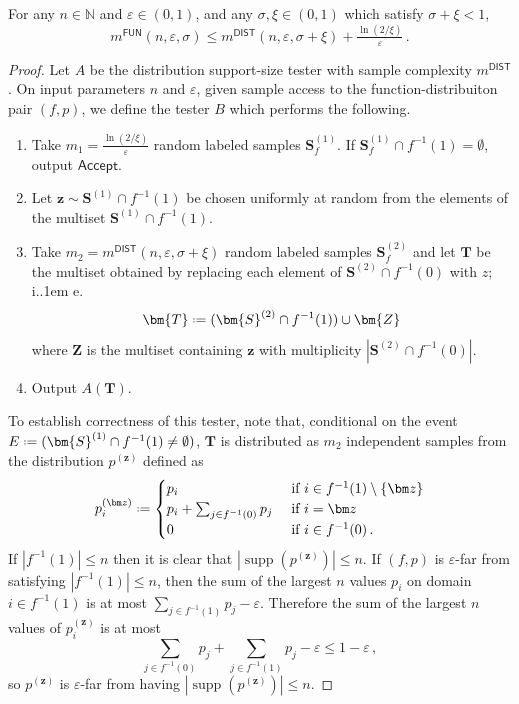 \documentclass{theoretics}
\newcommand*\ie{i.\kern.1em e.\ }
\DeclareMathOperator{\supp}{supp}   %
\newcommand*{\define}{\mathrel{\vcenter{\baselineskip0.5ex \lineskiplimit0pt
                      \hbox{\scriptsize.}\hbox{\scriptsize.}}}%
                      =}
\newcommand{\bN}{\ensuremath{\mathbb{N}}}
\newcommand{\ACCEPT}{\mathsf{Accept}}
\newcommand{\successprob}{\sigma}
\newcommand{\DIST}{\mathsf{DIST}}
\newcommand{\FUN}{\mathsf{FUN}}
\renewcommand{\epsilon}{\varepsilon}
\begin{document}
\begin{proposition}
\label{res:fun-to-dist}
For any $n \in \bN$ and $\epsilon \in (0,1)$, and any $\successprob, \xi \in (0,1)$ which satisfy
$\successprob + \xi < 1$,
\[
  m^\FUN(n,\epsilon, \successprob) \leq m^\DIST(n,\epsilon, \successprob + \xi) +
  \tfrac{\ln(2/\xi)}{\epsilon} \,.
\]
\end{proposition}
\begin{proof}
Let $A$ be the distribution support-size tester with sample complexity $m^\DIST$.
On input parameters $n$ and $\epsilon$, given sample access to the function-distribuiton pair
$(f,p)$, we define the tester $B$ which performs the following.
\begin{enumerate}
\item Take $m_1 = \tfrac{\ln(2/\xi)}{\epsilon}$ random labeled samples
$\bm{S}^{(1)}_f$. If $\bm{S}^{(1)}_f \cap f^{-1}(1) = \emptyset$, output $\ACCEPT$.
\item Let $\bm{z} \sim \bm{S}^{(1)} \cap f^{-1}(1)$ be chosen uniformly at random from the elements of the multiset
$\bm{S}^{(1)} \cap f^{-1}(1)$.
\item Take $m_2 = m^\DIST(n,\epsilon,\successprob + \xi)$ random labeled samples $\bm{S}^{(2)}_f$
and let $\bm{T}$ be the multiset obtained by replacing each element of $\bm{S}^{(2)} \cap f^{-1}(0)$
with $z$; \ie
\[
\bm{T} \define ( \bm{S}^{(2)} \cap f^{-1}(1) ) \cup \bm{Z}
\]
where  $\bm{Z}$ is the multiset containing $\bm{z}$ with multiplicity $|\bm{S}^{(2)} \cap
f^{-1}(0)|$.
\item Output $A(\bm{T})$.
\end{enumerate}
To establish correctness of this tester, note that, conditional on the event $E \define (\bm{S}^{(1)} \cap
f^{-1}(1) \neq \emptyset)$, $\bm{T}$ is distributed as $m_2$ independent samples from the
distribution $p^{(\bm z)}$ defined as
\[
  p^{(\bm z)}_i \define \begin{cases}
    p_i &\text{ if } i \in f^{-1}(1) \setminus \{\bm z\} \\
    p_i + \sum_{j \in f^{-1}(0)} p_j &\text{ if } i = \bm z \\
    0 &\text{ if } i \in f^{-1}(0) \,.
  \end{cases}
\]
If $|f^{-1}(1)| \leq n$ then it is clear that $|\supp(p^{(\bm z)})| \leq n$. If $(f,p)$ is
$\epsilon$-far from satisfying $|f^{-1}(1)| \leq n$, then the sum of the largest $n$ values $p_i$ on
domain $i \in f^{-1}(1)$ is at most $\sum_{j \in f^{-1}(1)} p_j -\epsilon$.  Therefore the sum of
the largest $n$ values of $p^{(\bm z)}_i$ is at most
\[
  \sum_{j \in f^{-1}(0)} p_j + \sum_{j \in f^{-1}(1)} p_j - \epsilon \leq 1 -\epsilon \,,
\]
so $p^{(\bm z)}$ is $\epsilon$-far from having $|\supp(p^{(\bm z)})| \leq n$.


\end{proof}
\end{document}
